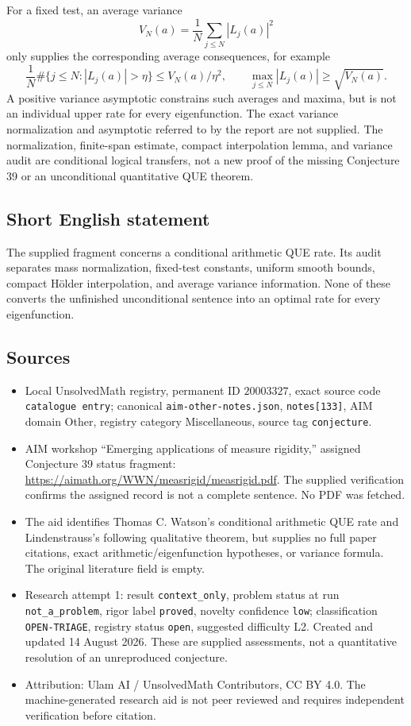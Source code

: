 \documentclass[11pt]{article}
\begin{document}
For a fixed test, an average variance
\[
 V_N(a)=\frac1N\sum_{j\leq N}|L_j(a)|^2
\]
only supplies the corresponding average consequences, for example
\[
 \frac1N\#\{j\leq N:|L_j(a)|>\eta\}\leq V_N(a)/\eta^2,
 \qquad\max_{j\leq N}|L_j(a)|\geq\sqrt{V_N(a)}.
\]
A positive variance asymptotic constrains such averages and maxima, but is not an individual upper rate for every eigenfunction. The exact variance normalization and asymptotic referred to by the report are not supplied. The normalization, finite-span estimate, compact interpolation lemma, and variance audit are conditional logical transfers, not a new proof of the missing Conjecture 39 or an unconditional quantitative QUE theorem.
\subsection{Short English statement}
The supplied fragment concerns a conditional arithmetic QUE rate. Its audit separates mass normalization, fixed-test constants, uniform smooth bounds, compact Hölder interpolation, and average variance information. None of these converts the unfinished unconditional sentence into an optimal rate for every eigenfunction.
\subsection{Sources}
\begin{itemize}
\item Local UnsolvedMath registry, permanent ID \(20003327\), exact source code \texttt{catalogue entry}; canonical \texttt{aim-other-notes.json}, \texttt{notes[133]}, AIM domain Other, registry category Miscellaneous, source tag \texttt{conjecture}.
\item AIM workshop ``Emerging applications of measure rigidity,'' assigned Conjecture 39 status fragment: \url{https://aimath.org/WWN/measrigid/measrigid.pdf}. The supplied verification confirms the assigned record is not a complete sentence. No PDF was fetched.
\item The aid identifies Thomas C. Watson's conditional arithmetic QUE rate and Lindenstrauss's following qualitative theorem, but supplies no full paper citations, exact arithmetic/eigenfunction hypotheses, or variance formula. The original literature field is empty.
\item Research attempt 1: result \texttt{context\_only}, problem status at run \texttt{not\_a\_problem}, rigor label \texttt{proved}, novelty confidence \texttt{low}; classification \texttt{OPEN-TRIAGE}, registry status \texttt{open}, suggested difficulty L2. Created and updated 14 August 2026. These are supplied assessments, not a quantitative resolution of an unreproduced conjecture.
\item Attribution: Ulam AI / UnsolvedMath Contributors, CC BY 4.0. The machine-generated research aid is not peer reviewed and requires independent verification before citation.
\end{itemize}
\end{document}
